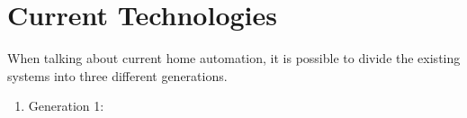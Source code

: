 \section{Current Technologies}
When talking about current home automation, it is possible to divide the existing systems into three different generations\cite{chinese-home-automation}.
\begin{enumerate}
    \item Generation 1: 
\end{enumerate}